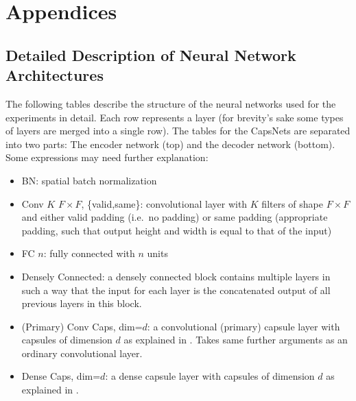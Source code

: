 \appendix
\section*{Appendices}
\renewcommand{\thesubsection}{\Alph{subsection}}

\subsection{Detailed Description of Neural Network Architectures}
\label{lab:networks}

The following tables describe the structure of the neural networks used for the experiments in detail. Each row represents a layer (for brevity's sake some types of layers are merged into a single row).
The tables for the CapsNets are separated into two parts: The encoder network (top) and the decoder network (bottom).
Some expressions may need further explanation:

\begin{itemize}
	\item BN: spatial batch normalization \citep{batchnorm}
	\item Conv $K$ $F \times F$, \{valid,same\}: convolutional layer with $K$ filters of shape $F \times F$ and either valid padding (i.e.\ no padding) or same padding (appropriate padding, such that output height and width is equal to that of the input)
	\item FC $n$: fully connected with $n$ units
	\item Densely Connected: a densely connected block \citep{denselyconnected} contains multiple layers in such a way that the input for each layer is the concatenated output of all previous layers in this block.
	\item (Primary) Conv Caps, dim=$d$: a convolutional (primary) capsule layer with capsules of dimension $d$ as explained in . Takes same further arguments as an ordinary convolutional layer.
	\item Dense Caps, dim=$d$: a dense capsule layer with capsules of dimension $d$ as explained in .
\end{itemize}

